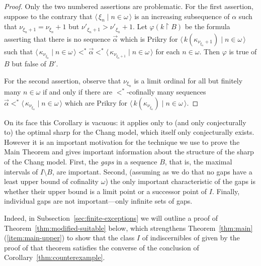 \documentclass[
twoside,
]{article}
\theoremstyle{definition}
\theoremstyle{remark}
\renewcommand{\phi}{\varphi}
\newcommand{\pair}[1]{\langle#1\rangle}
\newcommand{\seq}[1]{\pair{\,#1\,}}
\newcommand{\restrict}{{\upharpoonright}}
\begin{document}
\begin{proof}
  Only the two numbered assertions are problematic.   For the first
  assertion, suppose to the contrary that $\seq{\xi_n\mid n\in\omega}$
  is an increasing subsequence of $\alpha$ such that
  $\nu_{{\xi_n}+1}=\nu_{{\xi_n}}+1$ but
  $\nu'_{{\xi_{n}}+1}>\nu'_{\xi_n}+1$.
  Let  $\phi(k\restrict B)$ be the formula asserting that there is no
  sequence $\vec\alpha$ which is Prikry for
  $\seq{k(\kappa_{\nu_{\xi_n}+1})\mid n\in\omega}$ such that 
  $\seq{\kappa_{\nu_{\xi_n}}\mid
    n\in\omega}<^*\vec\alpha<^*\seq{\kappa_{\nu_{\xi_n+1}}\mid n\in\omega}$ for each
  $n\in\omega$.   Then $\phi$
  is  true of $B$ but false of $B'$.

  For the second assertion, observe that 
  $\nu_{\xi_n}$ is a limit ordinal for all but finitely many
  $n\in\omega$ if and only if 
  there are $<^*$-cofinally many
  sequences $\vec\alpha<^* \seq{\kappa_{\nu_{\xi_n}}\mid n\in\omega}$
  which are Prikry for $\seq{k(\kappa_{\nu_{\xi_n}})\mid n\in\omega}$.
\end{proof}

On its face this Corollary is vacuous: it applies only to (and only
conjecturally to) the optimal sharp for the Chang model, which itself
only conjecturally exists.   However it is an important  motivation
for the technique we use to prove the Main Theorem and  gives important
information about the structure of the sharp of the Chang model.
First, the \emph{gaps} in a sequence $B$, that is, the maximal
intervals of $I\setminus B$, are important.    Second, (assuming as we
do that no gaps have a least upper bound of cofinality $\omega$) the
only important characteristic of the gaps is whether their upper bound
is a limit point or a successor point of $I$.   Finally,  individual
gaps are not important---only 
infinite sets of gaps.

Indeed, in Subsection~\ref{sec:finite-exceptions} we will outline a
proof of Theorem~\ref{thm:modified-suitable} below, which strengthens
Theorem~\ref{thm:main}(\ref{item:main-upper}) to show that the class
$I$ of indiscernibles of given by the proof of that theorem satisfies
the converse of the conclusion  of
Corollary~\ref{thm:counterexample}.%
\end{document}
